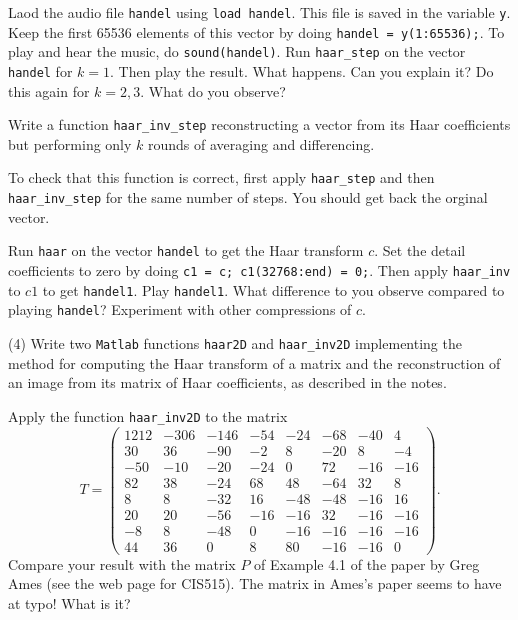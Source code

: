 \documentclass[12pt]{article}
\begin{document}
\medskip
Laod the audio file {\tt handel} using {\tt load handel}.
This file is saved in the variable {\tt y}. Keep the  first 65536
elements of this vector by doing
{\tt handel = y(1:65536);}.
To play and hear the music, do {\tt sound(handel)}.
Run {\tt haar\_step} on the vector {\tt handel} for $k = 1$.
Then play the result. What happens. Can you explain it?
Do this again for $k = 2, 3$. What do you observe?

\medskip
Write a function {\tt haar\_inv\_step} reconstructing a vector from
its Haar coefficients but performing only $k$ rounds of averaging and differencing.

\medskip
To check that this function is correct, first apply 
 {\tt haar\_step} and then  {\tt haar\_inv\_step} for the same number
 of steps. You should get back the orginal vector. 

\medskip
Run {\tt haar} on the vector {\tt handel}  to get the
Haar transform $c$. Set the detail coefficients to zero by doing
{\tt c1 = c; c1(32768:end) = 0;}. Then apply {\tt haar\_inv} to $c1$ to
get {\tt handel1}. Play {\tt handel1}. What difference to you observe
compared to playing {\tt handel}?
Experiment with other compressions of $c$.


\medskip
(4)
Write two {\tt Matlab} functions {\tt haar2D} and {\tt haar\_inv2D}
implementing the method for computing the Haar transform
of a  matrix and the reconstruction of an image from its matrix of Haar
coefficients, as described in the notes.

\medskip
Apply the function {\tt haar\_inv2D} to the matrix
\[
T = 
\begin{pmatrix}
1212 & -306 & -146 & -54 & -24 & -68 & -40 & 4 \\
    30 & 36 & -90 & -2 &  8 & -20 & 8  & -4 \\
    -50 & -10 & -20 & -24 & 0 & 72 & -16 & -16 \\
    82 & 38 & -24 & 68 & 48 & -64 & 32 & 8 \\
    8 & 8 & -32 & 16 & -48 & -48 & -16 & 16 \\
    20 & 20 & -56 & -16 & -16 & 32 & -16 & -16 \\
    -8 & 8 & -48 & 0 & -16 & -16 & -16 &  -16 \\
    44 & 36 & 0 & 8 & 80 & -16 & -16 & 0
\end{pmatrix}.
\]
Compare your result with the matrix $P$ of Example 4.1 of the paper by
Greg Ames (see the web page for CIS515). The matrix in Ames's paper
seems to have at typo! What is it?
\end{document}
